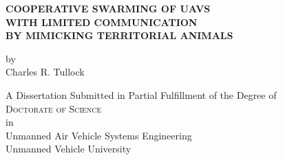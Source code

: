 
\begin{titlepage}
	\begin{center}

		\vspace*{1cm}
		 
		\large{ \textbf{ \uppercase{Cooperative swarming of UAVs\\with limited communication\\ by mimicking territorial animals}}}

		
		
		
		\vspace{1.5cm}
		
		by\\
		Charles R. Tullock\\
		
		\vspace{1.5cm}

		A Dissertation Submitted in Partial Fulfillment of the Degree of\\
		\large{\textsc{Doctorate of Science}}\\
		in\\
		\large{Unmanned Air Vehicle Systems Engineering}\\
		\vspace{1cm}
		\large{Unmanned Vehicle University}\\		
		

\end{center}
\end{titlepage}
